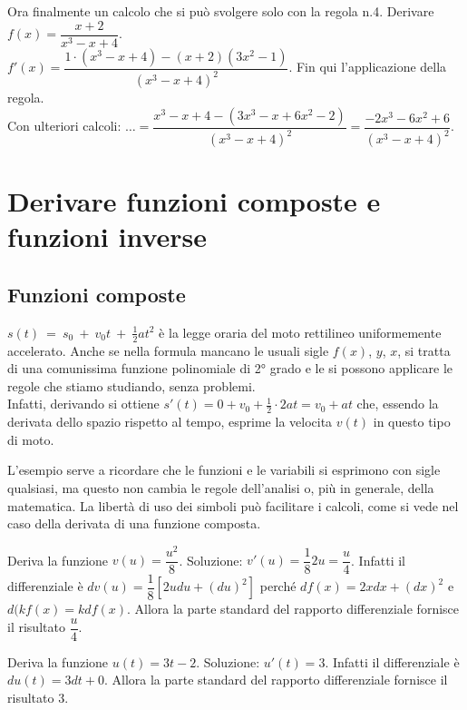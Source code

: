 \begin{esempio}
 Ora finalmente un calcolo che si può svolgere solo con la regola n.4.
 Derivare $f(x)= \dfrac{x+2}{x^3-x+4}$.\\
 $f'(x)=\dfrac{1\cdot(x^3-x+4)-(x+2)(3x^2-1)}{(x^3-x+4)^2}$. Fin qui 
 l'applicazione della regola. \\
 Con ulteriori calcoli:
 $\dots =\dfrac{x^3-x+4-(3x^3-x+6x^2-2)}{(x^3-x+4)^2}=
 \dfrac{-2x^3-6x^2+6}{(x^3-x+4)^2}$.\\
\end{esempio}


\section{Derivare funzioni composte e funzioni inverse}
\label{}
\subsection{Funzioni composte}
\label{subsec:diff01_dericomp}

\begin{esempio}
 $s(t)~=~s_0~+~v_0t~+~\frac{1}{2}at^2$ è la legge oraria del moto rettilineo
 uniformemente accelerato. Anche se nella formula mancano le usuali 
 sigle $f(x)$, $y$, $x$, si tratta di una comunissima funzione polinomiale
 di 2° grado e le si possono applicare le regole che stiamo studiando, senza
 problemi.\\
 Infatti, derivando si ottiene $s'(t)=0+v_0+\frac{1}{2}\cdot 2at=v_0+at$ che,
 essendo la derivata dello spazio rispetto al tempo, esprime la velocita $v(t)$
 in questo tipo di moto.
\end{esempio}
L'esempio serve a ricordare che le funzioni e le variabili si esprimono con 
sigle qualsiasi, ma questo non cambia le regole dell'analisi o, più in
generale, della matematica. La libertà di uso dei simboli può facilitare i
calcoli, come si vede nel caso della derivata di una funzione composta.
\begin{esempio}
  Deriva la funzione $v(u)=\dfrac{u^2}{8}$. 
  Soluzione: $v'(u)=\dfrac{1}{8}2u=\dfrac{u}{4}$. Infatti il 
  differenziale è $dv(u)=\dfrac{1}{8}[2udu+(du)^2]$ perché $df(x)=2xdx+(dx)^2$ 
  e $d(kf(x)=kdf(x)$. Allora  la parte 
 standard del rapporto differenziale fornisce il risultato $\dfrac{u}{4}$.
\end{esempio}

\begin{esempio}
Deriva la funzione $u(t)=3t-2$. Soluzione: $u'(t)=3$. Infatti il 
 differenziale è $du(t)=3dt+ 0$. Allora la parte 
 standard del rapporto differenziale fornisce il risultato $3$.
\end{esempio}

